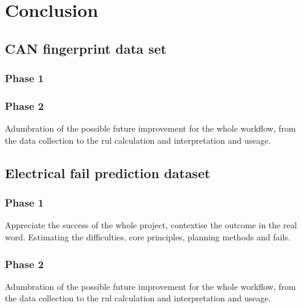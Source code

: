 \chapter{Conclusion}
\section{CAN fingerprint data set}
\subsection{Phase 1}





\subsection{Phase 2}
Adumbration of the possible future improvement for the whole workflow, from the data collection to the rul calculation and interpretation and useage.
\section{Electrical fail prediction dataset}
\subsection{Phase 1}
Appreciate the success of the whole project, contextise the outcome in the real word. Estimating the difficulties, core principles, planning methods and fails.

\subsection{Phase 2}
Adumbration of the possible future improvement for the whole workflow, from the data collection to the rul calculation and interpretation and useage.
